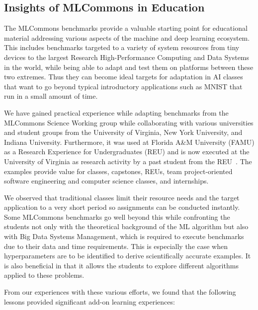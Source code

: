 \subsection{Insights of MLCommons in Education}
\label{sec:edu-mlcommons-insights}

The MLCommons benchmarks provide a valuable starting point for educational material addressing various aspects of the machine and deep learning ecosystem. This includes benchmarks targeted to a variety of system resources from tiny devices to the largest Research High-Performance Computing and Data Systems in the world, while being able to adapt and test them on platforms between these two extremes. Thus they can become ideal targets for adaptation in AI classes that want to go beyond typical introductory applications such as MNIST that run in a small amount of time.

We have gained practical experience while adapting benchmarks from the MLCommons Science Working group while collaborating with various universities and student groups from the University of Virginia, New York University, and Indiana University. Furthermore, it was used at Florida A\&M University (FAMU) as a Research Experience for Undergraduates (REU) and is now executed at the University of Virginia as research activity by a past student from the REU~\cite{las-2022-mdpi-crypto}. The examples provide value for classes, capstones, REUs, team project-oriented software engineering and computer science classes, and internships.

We observed that traditional classes limit their resource needs and the target application to a very short period so assignments can be conducted instantly.  Some MLCommons benchmarks go well beyond this while confronting the students not only with the theoretical background of the ML algorithm but also with Big Data Systems Management, which is required to execute benchmarks due to their data and time requirements. This is especially the case when hyperparameters are to be identified to derive scientifically accurate examples. It is also beneficial in that it allows the students to explore different algorithms applied to these problems.

From our experiences with these various efforts, we found that the following lessons provided significant add-on learning experiences:

